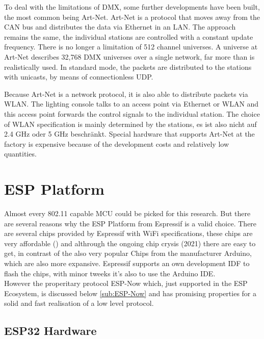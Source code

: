 To deal with the limitations of DMX, some further developments have been built, the most common being Art-Net.
Art-Net is a protocol that moves away from the CAN bus and distributes the data via Ethernet in an \ac{LAN}.
The approach remains the same, the individual stations are controlled with a constant update frequency.
There is no longer a limitation of 512 channel universes.
A universe at Art-Net describes 32,768 DMX universes over a single network, far more than is realistically used.
In standard mode, the packets are distributed to the stations with unicasts, by means of connectionless UDP.

Because Art-Net is a network protocol, it is also able to distribute packets via WLAN.
The lighting console talks to an access point via Ethernet or WLAN and this access point forwards the control signals to the individual station.
The choice of WLAN specification is mainly determined by the stations,
es ist also nicht auf 2.4 GHz oder 5 GHz beschränkt.
Special hardware that supports Art-Net at the factory is expensive because of the development costs and relatively low quantities.

\section{ESP Platform}

Almost every 802.11 capable \ac{MCU} could be picked for this research.
But there are several reasons why the ESP Platform from Espressif is a valid choice.
There are several chips provided by Espressif with WiFi specifications, these chips are very affordable () 
and althrough the ongoing chip crysis (2021) there are easy to get, in contrast of the also very popular Chips from the manufacturer Arduino, which are also more expansive.
Espressif supports an own development IDF to flash the chips, with minor tweeks it's also to use the Arduino IDE.\\
However the properitary protocol ESP-Now which, just supported in the ESP Ecosystem, is discussed below \cref{sub:ESP-Now} 
and has promising properties for a solid and fast realisation of a low level protocol.

\subsection{ESP32 Hardware}

